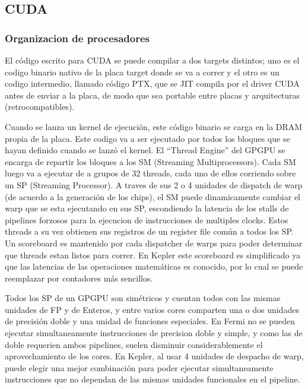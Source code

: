 \subsection{CUDA}

\subsubsection{Organizacion de procesadores}

El c\'odigo escrito para CUDA se puede compilar a dos targets distintos; uno es
el codigo binario nativo de la placa target donde se va a correr y el otro es un
codigo intermedio, llamado c\'odigo PTX, que se JIT compila por el driver CUDA
antes de enviar a la placa, de modo que sea portable entre placas y arquitecturas
(retrocompatibles).

Cuando se lanza un kernel de ejecuci\'on, este c\'odigo binario se carga en la DRAM propia
de la placa. Este codigo va a ser ejecutado por todos los bloques que se hayan definido cuando
se lanz\'o el kernel. El ``Thread Engine'' del GPGPU se encarga de repartir los bloques a los
SM (Streaming Multiprocessors). Cada SM luego va a ejecutar de a grupos de 32 threads, cada uno
de ellos corriendo sobre un SP (Streaming Processor). A traves de sus 2 o 4 unidades de dispatch de warp
(de acuerdo a la generaci\'on de los chips), el SM puede dinamicamente cambiar el warp que se esta ejecutando en sus SP,
escondiendo la latencia de los stalls de pipelines forzosos para la ejecucion de instrucciones de multiples clocks.
Estos threads a su vez obtienen sus registros de un register file com\'un a todos los SP. Un scoreboard
es mantenido por cada dispatcher de warps para poder determinar que threads estan listos para correr. En Kepler
este scoreboard es simplificado ya que las latencias de las operaciones matem\'aticas es conocido, por
lo cual se puede reemplazar por contadores m\'as sencillos. ~\cite{NvidiaKepler}

Todos los SP de un GPGPU son sim\'etricos y cuentan todos con las mismas unidades de FP y de Enteros,
y entre varios cores comparten una o dos unidades de precisi\'on doble y una unidad de funciones especiales.
En Fermi no se pueden ejecutar simultaneamente instrucciones de precision doble y simple, y como
las de doble requerien ambos pipelines, suelen disminuir considerablemente el aprovechamiento
de los cores. En Kepler, al usar 4 unidades de despacho de warp, puede elegir una mejor
combinaci\'on para poder ejecutar simultaneamente instrucciones que no dependan de las mismas
unidades funcionales en el pipeline. ~\cite{NvidiaKepler}

